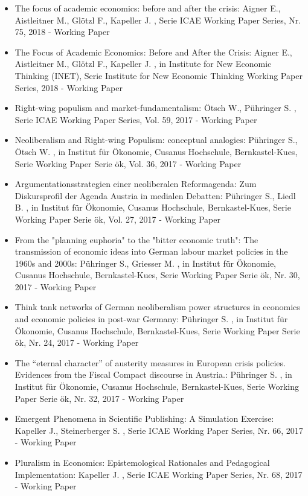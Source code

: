 \begin{itemize}
\item The focus of academic economics: before and after the crisis: Aigner E., Aistleitner M., Glötzl F., Kapeller J. , Serie ICAE Working Paper Series, Nr. 75, 2018 - Working Paper
\item The Focus of Academic Economics: Before and After the Crisis: Aigner E., Aistleitner M., Glötzl F., Kapeller J. , in Institute for New Economic Thinking (INET), Serie Institute for New Economic Thinking  Working Paper Series, 2018 - Working Paper
\item Right-wing populism and market-fundamentalism: Ötsch W., Pühringer S. , Serie ICAE Working Paper Series, Vol. 59, 2017 - Working Paper
\item Neoliberalism and Right-wing Populism: conceptual analogies: Pühringer S., Ötsch W. , in Institut für Ökonomie, Cusanus Hochschule, Bernkastel-Kues, Serie Working Paper Serie ök, Vol. 36, 2017 - Working Paper
\item Argumentationsstrategien einer neoliberalen Reformagenda: Zum Diskursprofil der Agenda Austria in medialen Debatten: Pühringer S., Liedl B. , in Institut für Ökonomie, Cusanus Hochschule, Bernkastel-Kues, Serie Working Paper Serie ök, Vol. 27, 2017 - Working Paper
\item From the "planning euphoria" to the "bitter economic truth": The transmission of economic ideas into German labour market policies in the 1960s and 2000s: Pühringer S., Griesser M. , in Institut für Ökonomie, Cusanus Hochschule, Bernkastel-Kues, Serie Working Paper Serie ök, Nr. 30, 2017 - Working Paper
\item Think tank networks of German neoliberalism power structures in economics and economic policies in post-war Germany: Pühringer S. , in Institut für Ökonomie, Cusanus Hochschule, Bernkastel-Kues, Serie Working Paper Serie ök, Nr. 24, 2017 - Working Paper
\item The “eternal character” of austerity measures in European crisis policies. Evidences from the Fiscal Compact discourse in Austria.: Pühringer S. , in Institut für Ökonomie, Cusanus Hochschule, Bernkastel-Kues, Serie Working Paper Serie ök, Nr. 32, 2017 - Working Paper
\item Emergent Phenomena in Scientific Publishing: A Simulation Exercise: Kapeller J., Steinerberger S. , Serie ICAE Working Paper Series, Nr. 66, 2017 - Working Paper
\item Pluralism in Economics: Epistemological Rationales and Pedagogical Implementation: Kapeller J. , Serie ICAE Working Paper Series, Nr. 68, 2017 - Working Paper

\end{itemize}
